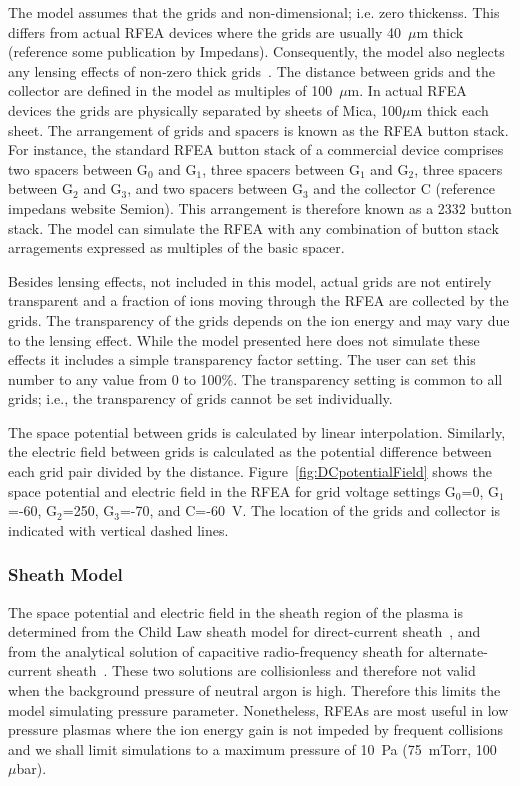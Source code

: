 The model assumes that the grids and non-dimensional; i.e. zero thickenss. This differs from actual RFEA devices where the grids are usually 40~$\mu$m thick (reference some publication by Impedans). Consequently, the model also neglects any lensing effects of non-zero thick grids~\cite{vandeVen2018,Buiter2018}. The distance between grids and the collector are defined in the model as multiples of 100~$\mu$m. In actual RFEA devices the grids are physically separated by sheets of Mica, 100$\mu$m thick each sheet. The arrangement of grids and spacers is known as the RFEA button stack. For instance, the standard RFEA button stack of a commercial device comprises two spacers between G$_0$ and G$_1$, three spacers between G$_1$ and G$_2$, three spacers between G$_2$ and G$_3$, and two spacers between G$_3$ and the collector C (reference impedans website Semion). This arrangement is therefore known as a 2332 button stack. The model can simulate the RFEA with any combination of button stack arragements expressed as multiples of the basic spacer. 

Besides lensing effects, not included in this model, actual grids are not entirely transparent and a fraction of ions moving through the RFEA are collected by the grids. The transparency of the grids depends on the ion energy and may vary due to the lensing effect. While the model presented here does not simulate these effects it includes a simple transparency factor setting. The user can set this number to any value from 0 to 100\%. The transparency setting is common to all grids; i.e., the transparency of grids cannot be set individually.     

The space potential between grids is calculated by linear interpolation. Similarly, the electric field between grids is calculated as the potential difference between each grid pair divided by the distance. Figure~\ref{fig:DCpotentialField} shows the space potential and electric field in the RFEA for grid voltage settings G$_0$=0, G$_1$=-60, G$_2$=250, G$_3$=-70, and C=-60~V. The location of the grids and collector is indicated with vertical dashed lines. 


\subsubsection{\label{SheathModel}Sheath Model}
The space potential and electric field in the sheath region of the plasma is determined from the Child Law sheath model for direct-current sheath~\cite{Lieberman2005}, and from the analytical solution of capacitive radio-frequency sheath for alternate-current sheath~\cite{Lieberman1988}. These two solutions are collisionless and therefore not valid when the background pressure of neutral argon is high. Therefore this limits the model simulating pressure parameter. Nonetheless, RFEAs are most useful in low pressure plasmas where the ion energy gain is not impeded by frequent collisions and we shall limit simulations to a maximum pressure of 10~Pa (75~mTorr, 100~$\mu$bar).  

